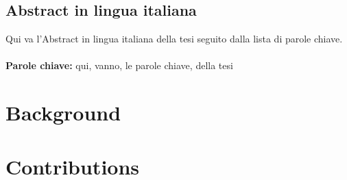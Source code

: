 \documentclass{Configuration_Files/PoliMi3i_thesis}
\begin{document}
\chapter*{Abstract in lingua italiana}
Qui va l'Abstract in lingua italiana della tesi seguito dalla lista di parole chiave.
\\
\\
\textbf{Parole chiave:} qui, vanno, le parole chiave, della tesi %


\thispagestyle{empty}
\tableofcontents %
\thispagestyle{empty}
\cleardoublepage





\mainmatter %




\part{Background}\label{part:background}




\part{Contributions}\label{part:contributions}






\end{document}
